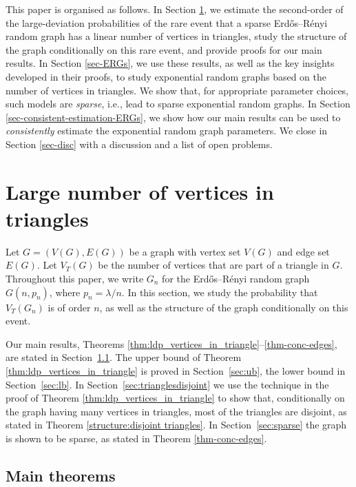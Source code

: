 \documentclass[bj,authoryear,noshowframe]{imsart}
\numberwithin{equation}{section}
\theoremstyle{plain}
\theoremstyle{definition}
\newcommand{\erdos}{Erd\H{o}s--R\'enyi random graph}
\begin{document}
This paper is organised as follows. In Section \ref{sec-many-vertices-triangles}, we estimate the second-order of the large-deviation probabilities of the rare event that a sparse \erdos{} has a linear number of vertices in triangles, study the structure of the graph conditionally on this rare event, and provide proofs for our main results. In Section \ref{sec-ERGs}, we use these results, as well as the key insights developed in their proofs, to study exponential random graphs based on the number of vertices in triangles. We show that, for appropriate parameter choices, such models are {\em sparse}, i.e., lead to sparse exponential random graphs. In Section \ref{sec-consistent-estimation-ERGs}, we show how our main results can be used to {\em consistently} estimate the exponential random graph parameters. We close in Section \ref{sec-disc} with a discussion and a list of open problems.


\section{Large number of vertices in triangles}
\label{sec-many-vertices-triangles}

Let $G=(V(G),E(G))$ be a graph with vertex set $V(G)$ and edge set $E(G)$. Let $V_{T}(G)$ be the number of vertices that are part of a triangle in $G$. Throughout this paper, we write $G_n$ for the \erdos{} $G(n,p_n)$, where $p_n=\lambda/n$. In this section, we study the probability that $V_{T}(G_n)$ is of order $n$, as well as the structure of the graph conditionally on this event. 

Our main results, Theorems \ref{thm:ldp_vertices_in_triangle}--\ref{thm-conc-edges}, are stated in Section~\ref{sec:thms}. The upper bound of Theorem \ref{thm:ldp_vertices_in_triangle} is proved in Section~\ref{sec:ub}, the lower bound in Section~\ref{sec:lb}. In Section~\ref{sec:trianglesdisjoint} we use the technique in the proof of Theorem \ref{thm:ldp_vertices_in_triangle} to show that, conditionally on the graph having many vertices in triangles, most of the triangles are disjoint, as stated in Theorem \ref{structure:disjoint triangles}. In Section~\ref{sec:sparse} the graph is shown to be sparse, as stated in Theorem \ref{thm-conc-edges}. 


\subsection{Main theorems}
\label{sec:thms}
\end{document}
